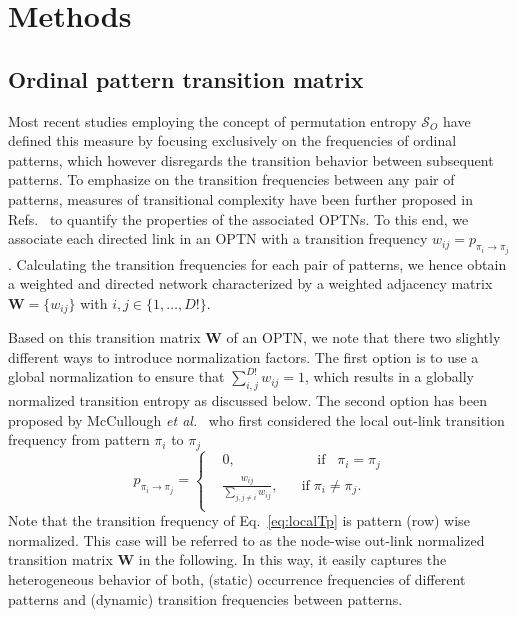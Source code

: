 \documentclass[aip,cha,reprint,nofootinbib]{revtex4-1}
\begin{document}
\section{Methods} \label{sec:methods}

\subsection{Ordinal pattern transition matrix} \label{sec:OPW}

Most recent studies employing the concept of permutation entropy $\mathcal{S}_O$ have defined this measure by focusing exclusively on the frequencies of ordinal patterns, which however disregards the transition behavior between subsequent patterns. To emphasize on the transition frequencies between any pair of patterns, measures of transitional complexity have been further proposed in Refs.~\cite{zhangSciRep2017,McCullough2017b} to quantify the properties of the associated OPTNs. To this end, we associate each directed link in an OPTN with a transition frequency $w_{ij} = p_{\pi_i \to \pi_j}$. Calculating the transition frequencies for each pair of patterns, we hence obtain a weighted and directed network characterized by a weighted adjacency matrix $\mathbf{W} = \{ w_{ij} \}$ with $i, j \in \{1,\ldots, D!\}$. 

Based on this transition matrix $\mathbf{W}$ of an OPTN, we note that there two slightly different ways to introduce normalization factors. The first option \cite{zhangSciRep2017} is to use a global normalization to ensure that $\sum_{i,j}^{D!} w_{ij} = 1$, which results in a globally normalized transition entropy as discussed below. The second option has been proposed by McCullough {\textit{et al.}}~\cite{McCullough2017b} who first considered the local out-link transition frequency from pattern $\pi_i$ to $\pi_j$
\begin{equation} \label{eq:localTp}
p_{\pi_i \to \pi_j} = \left \{ \begin{aligned}
				& 0,  \;\;\;\;\;\;\;\;\;\;\;\;\;\;\;\;\;\;\;\;\; \text{if} \;\;\; \pi_i = \pi_j \\
				& \frac{w_{ij}}{\sum_{j, j \neq i} w_{ij}}, \;\;\;\;\;\; \text{if} \; \pi_i \neq \pi_j.\\
				\end{aligned}
				\right.
\end{equation}
\noindent
Note that the transition frequency of Eq.~\eqref{eq:localTp} is pattern (row) wise normalized. This case will be referred to as the node-wise out-link normalized transition matrix $\mathbf{W}$ in the following. In this way, it easily captures the heterogeneous behavior of both, (static) occurrence frequencies of different patterns and (dynamic) transition frequencies between patterns. 
\end{document}

